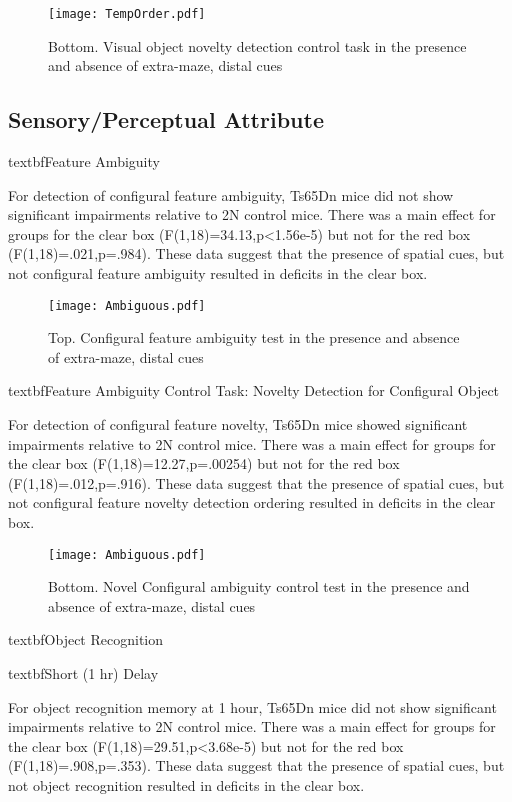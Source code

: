 \documentclass{article}
\begin{document}
\begin{figure}[h!]
\centering
\texttt{[image: TempOrder.pdf]}
\caption{Bottom. Visual object novelty detection control task in the presence and absence of extra-maze, distal cues}
\label{fig:TemporalOrder}
\end{figure}

\subsection{Sensory/Perceptual Attribute}

textbf{Feature Ambiguity}

For detection of configural feature ambiguity, Ts65Dn mice did not show significant impairments relative to 2N control mice. There was a main effect for groups for the clear box (F(1,18)=34.13,p<1.56e-5) but not for the red box (F(1,18)=.021,p=.984). These data suggest that the presence of spatial cues, but not configural feature ambiguity resulted in deficits in the clear box.

\begin{figure}[h!]
\centering
\texttt{[image: Ambiguous.pdf]}
\caption{Top. Configural feature ambiguity test in the presence and absence of extra-maze, distal cues}
\label{fig:Ambiguity}
\end{figure}

textbf{Feature Ambiguity Control Task: Novelty Detection for Configural Object}

For detection of configural feature novelty, Ts65Dn mice showed significant impairments relative to 2N control mice. There was a main effect for groups for the clear box (F(1,18)=12.27,p=.00254) but not for the red box (F(1,18)=.012,p=.916). These data suggest that the presence of spatial cues, but not configural feature novelty detection ordering resulted in deficits in the clear box.

\begin{figure}[h!]
\centering
\texttt{[image: Ambiguous.pdf]}
\caption{Bottom. Novel Configural ambiguity control test in the presence and absence of extra-maze, distal cues}
\label{fig:Ambiguity}
\end{figure}

textbf{Object Recognition}

textbf{Short (1 hr) Delay}

For object recognition memory at 1 hour, Ts65Dn mice did not show significant impairments relative to 2N control mice. There was a main effect for groups for the clear box (F(1,18)=29.51,p<3.68e-5) but not for the red box (F(1,18)=.908,p=.353). These data suggest that the presence of spatial cues, but not object recognition resulted in deficits in the clear box.
\end{document}
